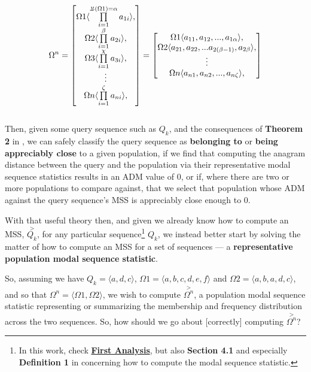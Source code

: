 \documentclass[a4paper, 18pt]{book} %
\newcommand{\invpi}{\rotatebox[origin=c]{180}{$\pi$}}
\begin{document}
\begin{multline}
 \Omega^n = 
 \begin{bmatrix}
 \Omega1 \langle \prod\limits_{i=1}^{\invpi(\Omega 1) = \alpha} a_{1i} \rangle,\\
  \Omega2 \langle \prod\limits_{i=1}^{\beta} a_{2i} \rangle,\\
   \Omega3 \langle \prod\limits_{i=1}^{\chi} a_{3i} \rangle,\\
   \vdots \\
   \Omega n \langle \prod\limits_{i=1}^{\zeta} a_{ni} \rangle,\\
 \end{bmatrix} =
 \begin{bmatrix}
 \Omega1 \langle a_{11},a_{12},...,a_{1\alpha} \rangle,\\
   \Omega2 \langle a_{21},a_{22},...a_{2(\beta-1)} ,a_{2\beta} \rangle,\\
   \vdots \\
     \Omega n \langle a_{n1},a_{n2},...,a_{n\zeta} \rangle,\\
 \end{bmatrix}
\end{multline}\\


Then, given some query sequence such as $Q_k$, and the consequences of \textbf{Theorem 2} in \cite{transformatics}, we can safely classify the query sequence as \textbf{belonging to} or \textbf{being appreciably close} to a given population, if we find that computing the anagram distance between the query and the population via their representative modal sequence statistics results in an ADM value of 0, or if, where there are two or more populations to compare against, that we select that population whose ADM against the query sequence's MSS is appreciably close enough to 0.

With that useful theory then, and given we already know how to compute an MSS, $\overset{>}{Q_k}$, for any particular sequence\footnote{In this work, check \textbf{\hyperref[SECFANAL]{First Analysis}}, but also \textbf{Section 4.1} and especially \textbf{Definition 1} in \cite{transformatics} concerning how to compute the modal sequence statistic.} $Q_k$, we instead better start by solving the matter of how to compute an MSS for a set of sequences --- a \textbf{representative population modal sequence statistic}.


So, assuming we have $Q_k = \langle a, d, c \rangle$, $\Omega1 = \langle a, b, c, d, e, f \rangle$ and $\Omega2 = \langle a, b, a, d, c \rangle$, and so that $\Omega^n = \langle \Omega1, \Omega2 \rangle$, we wish to compute $\overset{>}{\Omega^n}$, a population modal sequence statistic representing or summarizing the membership and frequency distribution across the two sequences. So, how should we go about [correctly] computing $\overset{>}{\Omega^n}$?
\end{document}
